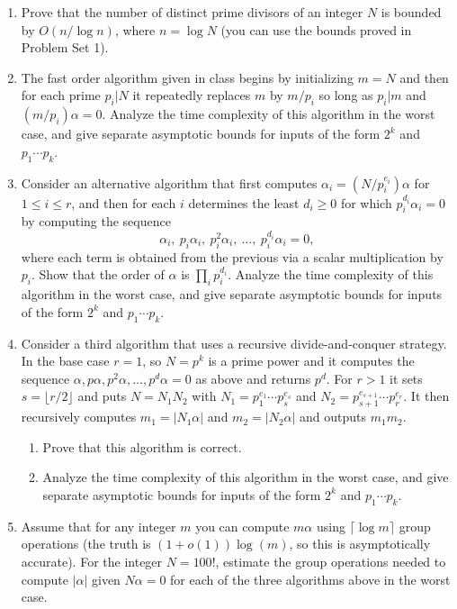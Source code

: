 \documentclass[11pt]{article}
\begin{document}
\begin{enumerate}[{\bf (a)}]
\item Prove that the number of distinct prime divisors of an integer $N$ is bounded by $O(n/\log n)$, where $n=\log N$ (you can use the bounds proved in Problem Set 1).
\item The fast order algorithm given in class begins by initializing $m=N$ and then for each prime $p_i|N$ it repeatedly replaces $m$ by $m/p_i$ so  long as $p_i|m$ and $(m/p_i)\alpha=0$.
Analyze the time complexity of this algorithm in the worst case, and give separate asymptotic bounds for inputs of the form $2^k$ and $p_1\cdots p_k$.
\item Consider an alternative algorithm that first computes $\alpha_i=(N/p_i^{e_i})\alpha$ for $1\le i\le r$, and then for each $i$ determines the least $d_i\ge 0$ for which $p_i^{d_i}\alpha_i=0$ by computing the sequence
\[
\alpha_i,\  p_i\alpha_i,\  p_i^2\alpha_i,\  \ldots,\  p_i^{d_i}\alpha_i=0,
\]
where each term is obtained from the previous via a scalar multiplication by $p_i$.
Show that the order of $\alpha$ is $\prod_i p_i^{d_i}$.
Analyze the time complexity of this algorithm in the worst case, and give separate asymptotic bounds for inputs of the form $2^k$ and $p_1\cdots p_k$.
\item Consider a third algorithm that uses a recursive divide-and-conquer strategy.
In the base case $r=1$, so $N=p^k$ is a prime power and it computes the sequence $\alpha, p\alpha, p^2\alpha,\ldots,p^d\alpha=0$ as above and returns $p^d$.
For $r > 1$ it sets $s=\lfloor r/2\rfloor$ and puts $N=N_1N_2$ with $N_1=p_1^{e_1}\cdots p_s^{e_s}$ and $N_2=p_{s+1}^{e_{s+1}}\cdots  p_r^{e_r}$.  It then recursively computes $m_1 = |N_1\alpha|$ and $m_2 = |N_2\alpha|$ and outputs $m_1m_2$.
\begin{enumerate}[{\bf (i)}]
\item Prove that this algorithm is correct.
\item Analyze the time complexity of this algorithm in the worst case, and give separate asymptotic bounds for inputs of the form $2^k$ and $p_1\cdots p_k$.
\end{enumerate}
\item Assume that for any integer $m$ you can compute $m\alpha$ using $\lceil \log m\rceil$ group operations (the truth is $(1+o(1))\log(m)$, so this is asymptotically accurate).
For the integer $N=100!$, estimate the group operations needed to compute $|\alpha|$ given $N\alpha=0$ for each of the three algorithms above in the worst case.
\end{enumerate}
\end{document}
